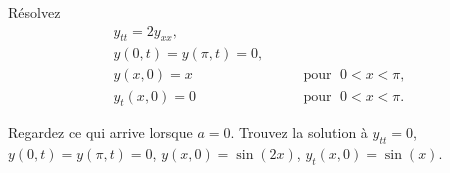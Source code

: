 \begin{exercise}
Résolvez
\begin{equation*}
\begin{array}{ll}
y_{tt} = 2 y_{xx} , &  \\
y(0,t) = y(\pi,t) = 0 , &  \\
y(x,0) = x & \qquad \text{pour } \; 0 < x < \pi , \\
y_t(x,0) = 0 & \qquad \text{pour } \; 0 < x < \pi .
\end{array}
\end{equation*}
\end{exercise}
\exsol{%
$
y(x,t)
=
\sum\limits_{n=1}^\infty
\frac{2{(-1)}^{n+1}}{n}
\sin(nx)
\cos( n \sqrt{2}\,t ) 
$
}

\begin{exercise}
Regardez ce qui arrive lorsque $a=0$.  Trouvez la solution à
$y_{tt} = 0$, $y(0,t) = y(\pi,t) = 0$,
$y(x,0) = \sin(2x)$,
$y_t(x,0) = \sin(x)$.
\end{exercise}


